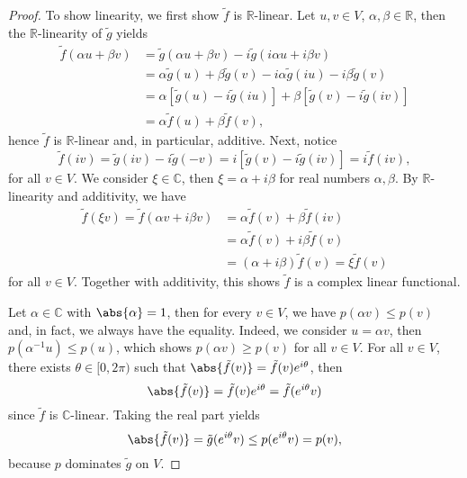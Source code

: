 \begin{proof}
    To show linearity, we first show \(\tilde{f}\) is \(\mathbb{R}\)-linear. Let \(u, v \in V\), \(\alpha, \beta \in \mathbb{R}\), then the \(\mathbb{R}\)-linearity of \(\tilde{g}\) yields
    \begin{align*}
        \tilde{f}(\alpha u + \beta v) &= \tilde{g}(\alpha u + \beta v) - i \tilde{g}(i \alpha u + i \beta v)\\
                                      &= \alpha \tilde{g}(u) + \beta \tilde{g}(v) - i \alpha \tilde{g}(iu) - i \beta \tilde{g}(v)\\
                                      &= \alpha \left[\tilde{g}(u) - i \tilde{g}(iu)\right] + \beta \left[\tilde{g}(v) - i \tilde{g}(iv)\right]\\
                                      &= \alpha \tilde{f}(u) + \beta \tilde{f}(v),
    \end{align*}
    hence \(\tilde{f}\) is \(\mathbb{R}\)-linear and, in particular, additive. Next, notice
    \begin{equation*}
        \tilde{f}(iv) = \tilde{g}(iv) -i \tilde{g}(-v) = i \left[\tilde{g}(v) - i\tilde{g}(iv)\right] = i \tilde{f}(iv),
    \end{equation*}
    for all \(v \in V\). We consider \(\xi \in \mathbb{C}\), then \(\xi = \alpha + i \beta\) for real numbers \(\alpha, \beta\). By \(\mathbb{R}\)-linearity and additivity, we have
    \begin{align*}
        \tilde{f}(\xi v) = \tilde{f}(\alpha v + i \beta v) &= \alpha \tilde{f}(v) + \beta \tilde{f}(iv)\\ &= \alpha \tilde{f} (v) + i \beta \tilde{f}(v)\\&= (\alpha + i \beta) \tilde{f}(v) = \xi \tilde{f}(v)
    \end{align*}
    for all \(v \in V\). Together with additivity, this shows \(\tilde{f}\) is a complex linear functional.

    Let \(\alpha \in \mathbb{C}\) with \(\abs{\alpha} = 1\), then for every \(v \in V\), we have \(p(\alpha v) \leq p(v)\) and, in fact, we always have the equality. Indeed, we consider \(u = \alpha v\), then \(p(\alpha^{-1} u) \leq p(u)\), which shows \(p(\alpha v) \geq p(v)\) for all \(v \in V\). For all \(v \in V\), there exists \(\theta \in [0,2\pi)\) such that \(\abs{\tilde{f}(v)} = \tilde{f}(v) e^{i\theta}\), then
    \begin{equation*}
        \abs{\tilde{f}(v)} = \tilde{f}(v) e^{i\theta} = \tilde{f}(e^{i\theta}v)
    \end{equation*}
    since \(\tilde{f}\) is \(\mathbb{C}\)-linear. Taking the real part yields
    \begin{equation*}
        \abs{\tilde{f}(v)} = \tilde{g}(e^{i\theta}v) \leq p(e^{i\theta}v) = p(v),
    \end{equation*}
    because \(p\) dominates \(\tilde{g}\) on \(V\).
\end{proof}


